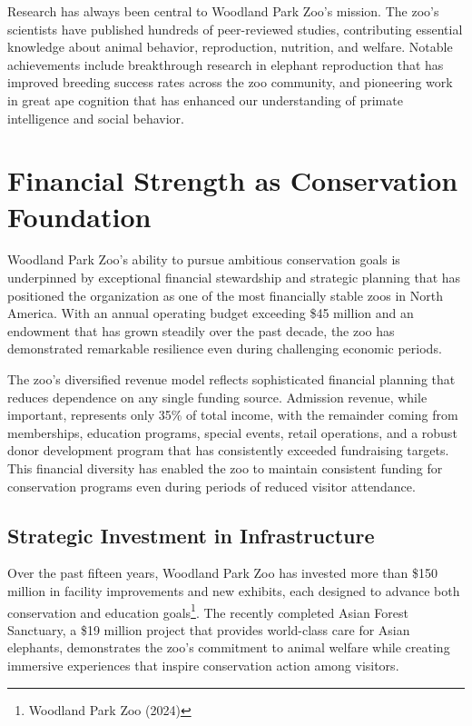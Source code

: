 \documentclass[
  Letterpaper,
]{scrbook}
\begin{document}
Research has always been central to Woodland Park Zoo's mission. The
zoo's scientists have published hundreds of peer-reviewed studies,
contributing essential knowledge about animal behavior, reproduction,
nutrition, and welfare. Notable achievements include breakthrough
research in elephant reproduction that has improved breeding success
rates across the zoo community, and pioneering work in great ape
cognition that has enhanced our understanding of primate intelligence
and social behavior.

\section{Financial Strength as Conservation
Foundation}\label{financial-strength-as-conservation-foundation}

Woodland Park Zoo's ability to pursue ambitious conservation goals is
underpinned by exceptional financial stewardship and strategic planning
that has positioned the organization as one of the most financially
stable zoos in North America. With an annual operating budget exceeding
\$45 million and an endowment that has grown steadily over the past
decade, the zoo has demonstrated remarkable resilience even during
challenging economic periods.

The zoo's diversified revenue model reflects sophisticated financial
planning that reduces dependence on any single funding source. Admission
revenue, while important, represents only 35\% of total income, with the
remainder coming from memberships, education programs, special events,
retail operations, and a robust donor development program that has
consistently exceeded fundraising targets. This financial diversity has
enabled the zoo to maintain consistent funding for conservation programs
even during periods of reduced visitor attendance.

\subsection{Strategic Investment in
Infrastructure}\label{strategic-investment-in-infrastructure}

Over the past fifteen years, Woodland Park Zoo has invested more than
\$150 million in facility improvements and new exhibits, each designed
to advance both conservation and education goals\footnote{Woodland Park
  Zoo (2024)}. The recently completed Asian Forest Sanctuary, a \$19
million project that provides world-class care for Asian elephants,
demonstrates the zoo's commitment to animal welfare while creating
immersive experiences that inspire conservation action among visitors.
\end{document}
